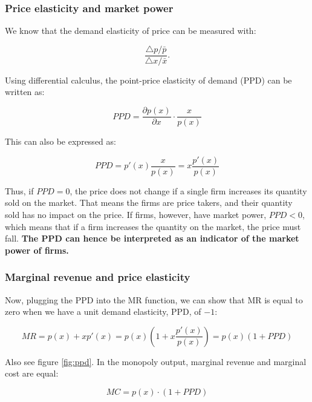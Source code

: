 \documentclass[
  12pt,
  oneside]{book}
\theoremstyle{definition}
\theoremstyle{definition}
\theoremstyle{definition}
\theoremstyle{definition}
\theoremstyle{remark}
\begin{document}
\hypertarget{price-elasticity-and-market-power}{%
\subsubsection*{Price elasticity and market power}\label{price-elasticity-and-market-power}}

We know that the demand elasticity of price can be measured with:

\[ \frac{\triangle p/\bar{p}}{\triangle x / \bar{x}}. \]

Using differential calculus, the point-price elasticity of demand (PPD) can be written as:

\[ PPD = \frac{\partial p(x)}{\partial x} \cdot \frac{x}{p(x)} \]

This can also be expressed as:

\[ PPD = p'(x) \frac{x}{p(x)} = x \frac{p'(x)}{p(x)} \]

Thus, if \(PPD = 0\), the price does not change if a single firm increases its quantity sold on the market. That means the firms are price takers, and their quantity sold has no impact on the price. If firms, however, have market power, \(PPD < 0\), which means that if a firm increases the quantity on the market, the price must fall. \textbf{The PPD can hence be interpreted as an indicator of the market power of firms.}

\hypertarget{marginal-revenue-and-price-elasticity}{%
\subsubsection*{Marginal revenue and price elasticity}\label{marginal-revenue-and-price-elasticity}}

Now, plugging the PPD into the MR function, we can show that MR is equal to zero when we have a unit demand elasticity, PPD, of \(-1\):

\[ MR = p(x) + xp'(x) = p(x)\left(1 + x\frac{p'(x)}{p(x)}\right) = p(x)\left(1 + PPD\right) \]

Also see figure \ref{fig:ppd}. In the monopoly output, marginal revenue and marginal cost are equal:

\[ MC = p(x) \cdot \left(1 + PPD\right) \]
\end{document}
